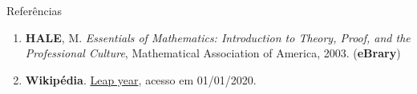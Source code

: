 \begin{frame}[fragile]{Referências}

    \begin{enumerate}
        \item \textbf{HALE}, M. \textit{Essentials of Mathematics: Introduction to Theory, Proof, and the Professional Culture}, Mathematical Association of America, 2003. (\textbf{eBrary})

        \item \textbf{Wikipédia}. \href{https://en.wikipedia.org/wiki/Leap_year}{Leap year},
            acesso em 01/01/2020.

    \end{enumerate}

\end{frame}
